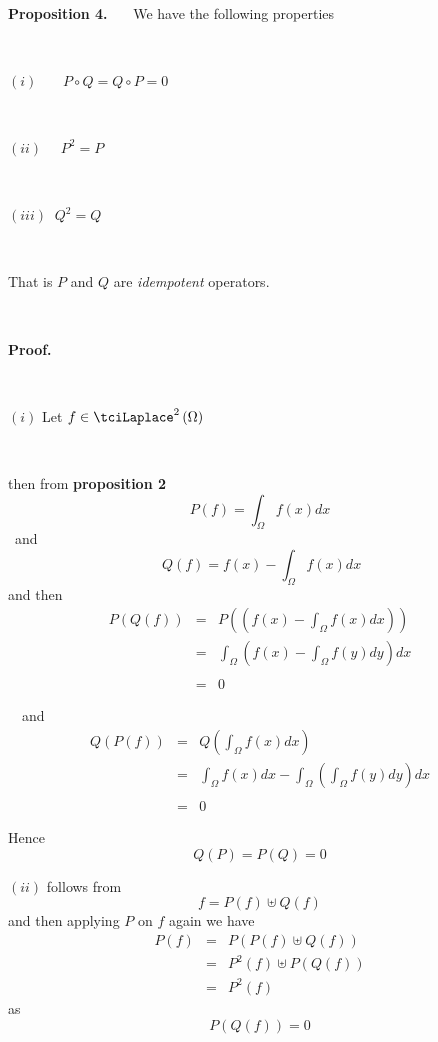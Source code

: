 \documentclass{amsproc}
\theoremstyle{plain}
\numberwithin{equation}{section}
\begin{document}
\ \ 

\textbf{Proposition 4. }\ \ \ We have the following properties

\ \ \ \ \ \ \ \ \ \ \ \ \ \ \ \ \ \ \ \ \ \ \ \ \ \ \ \ \ 

$(i)$ \ \ \ $P\circ Q=Q\circ P=0$

\ \ \ \ \ \ \ \ \ \ \ \ \ \ \ \ \ \ \ 

$(ii)$ \ \ $P^{2}=P$

\ \ \ \ \ \ \ \ \ \ \ \ \ \ \ \ \ \ \ \ \ \ 

$(iii)$ $\ Q^{2}=Q$

\ \ \ \ \ \ \ \ \ \ \ \ \ \ \ \ \ \ \ \ \ \ \ \ \ 

That is $P$ and $Q$ are \textit{idempotent} operators.

\ \ \ \ \ \ \ \ \ \ \ \ \ \ \ \ \ \ \ \ \ \ \ \ \ \ \ 

\textbf{Proof. }

\ 

$\left( i\right) $ Let $f\in \tciLaplace ^{2}\left( \Omega \right) $

\ 

then from \textbf{proposition 2 }\begin{equation*}
P(f)=\int_{\Omega }f(x)dx
\end{equation*}\ and 
\begin{equation*}
\ Q(f)=f(x)-\int_{\Omega }f(x)dx
\end{equation*}and then 
\begin{eqnarray*}
P(Q(f)) &=&P\left( \left( f(x)-\int_{\Omega }f(x)dx\right) \right) \\
&=&\int_{\Omega }\left( f(x)-\int_{\Omega }f(y)dy\right) dx \\
&& \\
&=&0\text{ \ }
\end{eqnarray*}

\ \ and\begin{eqnarray*}
Q(P(f)) &=&Q\left( \int_{\Omega }f(x)dx\right) \\
&=&\int_{\Omega }f(x)dx-\int_{\Omega }\left( \int_{\Omega }f(y)dy\right) dx
\\
&& \\
&=&0
\end{eqnarray*}

Hence 
\begin{equation*}
Q(P)=P(Q)=0
\end{equation*}

\bigskip

$\left( ii\right) $ follows from\begin{equation*}
f=P(f)\uplus Q(f)
\end{equation*}
and then applying $P$ on $f$ again we have 
\begin{eqnarray*}
P(f) &=&P\left( P(f)\uplus Q(f)\right) \\
&=&P^{2}(f)\uplus P(Q(f)) \\
&=&P^{2}(f)
\end{eqnarray*}as 
\begin{equation*}
P(Q(f))=0
\end{equation*}
\end{document}
